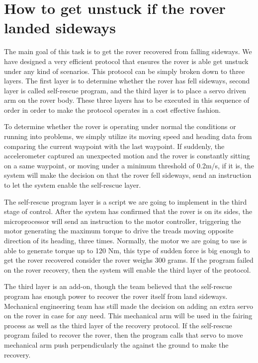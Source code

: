 \documentclass[10pt,letterpaper,onecolumn,journal]{IEEEtran}
\begin{document}
\section{How to get unstuck if the rover landed sideways}
The main goal of this task is to get the rover recovered from falling sideways. We have designed a very efficient protocol that ensures the rover is able get unstuck under any kind of scenarios. This protocol can be simply broken down to three layers. The first layer is to determine whether the rover has fell sideways, second layer is called self-rescue program, and the third layer is to place a servo driven arm on the rover body. These three layers has to be executed in this sequence of order in order to make the protocol operates in a cost effective fashion.\vspace{.3cm}
\par
To determine whether the rover is operating under normal the conditions or running into problems, we simply utilize its moving speed and heading data from comparing the current waypoint with the last waypoint. If suddenly, the accelerometer captured an unexpected motion and the rover is constantly sitting on a same waypoint, or moving under a minimum threshold of 0.2m/s, if it is, the system will make the decision on that the rover fell sideways, send an instruction to let the system enable the self-rescue layer.\vspace{.3cm}
\par
The self-rescue program layer is a script we are going to implement in the third stage of control. After the system has confirmed that the rover is on its sides, the microprocessor will send an instruction to the motor controller, triggering the motor generating the maximum torque to drive the treads moving opposite direction of its heading, three times. Normally, the motor we are going to use is able to generate torque up to 120 Nm, this type of sudden force is big enough to get the rover recovered consider the rover weighs 300 grams. If the program failed on the rover recovery, then the system will enable the third layer of the protocol. \vspace{.3cm}
\par
The third layer is an add-on, though the team believed that the self-rescue program has enough power to recover the rover itself from land sideways. Mechanical engineering team has still made the decision on adding an extra servo on the rover in case for any need. This mechanical arm will be used in the fairing process as well as the third layer of the recovery protocol. If the self-rescue program failed to recover the rover, then the program calls that servo to move mechanical arm push perpendicularly the against the ground to make the recovery. \vspace{.3cm}
\par
\end{document}
